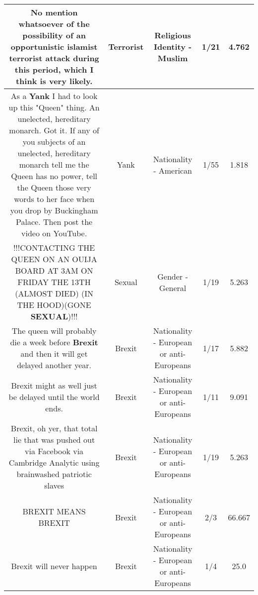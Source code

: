 \documentclass[11pt]{article}
\newlength\mylength
\begin{document}
\begin{center}
\begin{longtable}{|C{.65\mylength}|C{.30\mylength}|C{.12\mylength}|C{.12\mylength}|C{.12\mylength}|}
  \small No mention whatsoever of the possibility of an opportunistic  islamist \textbf{terrorist} attack during this period, which I think is very likely.\normalsize   & Terrorist & Religious Identity - Muslim & 1/21 & 4.762 \\  \hline
  \small As a \textbf{Yank} I had to look up this "Queen" thing. An unelected, hereditary monarch. Got it. If any of you subjects of an unelected, hereditary monarch tell me the Queen has no power, tell the Queen those very words to her face when you drop by Buckingham Palace. Then post the video on YouTube.\normalsize   & Yank & Nationality - American & 1/55 & 1.818 \\  \hline
  \small !!!CONTACTING THE QUEEN ON AN OUIJA BOARD AT 3AM ON FRIDAY THE 13TH (ALMOST DIED) (IN THE HOOD)(GONE \textbf{SEXUAL})!!!\normalsize   & Sexual & Gender - General & 1/19 & 5.263 \\  \hline
  \small The queen will probably die a week before \textbf{Brexit} and then it will get delayed another year.\normalsize   & Brexit & Nationality - European or anti-Europeans & 1/17 & 5.882 \\  \hline
  \small Brexit might as well just be delayed until the world ends.\normalsize   & Brexit & Nationality - European or anti-Europeans & 1/11 & 9.091 \\  \hline
  \small Brexit, oh yer, that total lie that was pushed out via Facebook via Cambridge Analytic using brainwashed patriotic slaves\normalsize   & Brexit & Nationality - European or anti-Europeans & 1/19 & 5.263 \\  \hline
  \small BREXIT MEANS BREXIT\normalsize   & Brexit & Nationality - European or anti-Europeans & 2/3 & 66.667 \\  \hline
  \small Brexit will never happen\normalsize   & Brexit & Nationality - European or anti-Europeans & 1/4 & 25.0 \\  \hline

\end{longtable}
\end{center}
\end{document}
